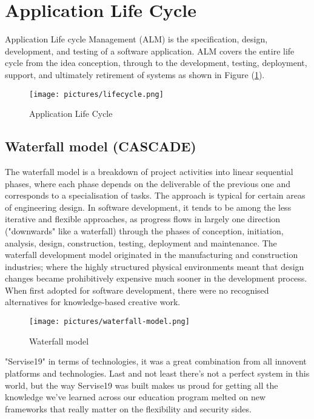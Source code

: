 \documentclass[12pt]{report}
\begin{document}
\section{Application Life Cycle}


Application Life cycle Management (ALM) is the specification, design, development, and testing of a software application. ALM covers the entire life cycle from the idea conception, through to the development, testing, deployment, support, and ultimately retirement of systems as shown in Figure (\ref{fig:applifecycle}).

\begin{figure}[!htbp]

        \centering
    \texttt{[image: pictures/lifecycle.png]}
    \caption{Application Life Cycle}
    \label{fig:applifecycle}
\end{figure}
\pagebreak
\subsection{Waterfall model (CASCADE)}
The waterfall model is a breakdown of project activities into linear sequential phases, where each phase depends on the deliverable of the previous one and corresponds to a specialisation of tasks. The approach is typical for certain areas of engineering design. In software development, it tends to be among the less iterative and flexible approaches, as progress flows in largely one direction ("downwards" like a waterfall) through the phases of conception, initiation, analysis, design, construction, testing, deployment and maintenance.
The waterfall development model originated in the manufacturing and construction industries; where the highly structured physical environments meant that design changes became prohibitively expensive much sooner in the development process. When first adopted for software development, there were no recognised alternatives for knowledge-based creative work.

\begin{figure}[!htbp]

        \centering
    \texttt{[image: pictures/waterfall-model.png]}
    \caption{Waterfall model}
    \label{fig:waterfallmodel}
\end{figure}
\pagebreak

"Servise19" in terms of technologies, it was a great combination from all innovent platforms and technologies.
Last and not least there's not a perfect system in this world, but the way Servise19 was built makes us proud for getting all the knowledge we've learned across our education program melted on new frameworks that really matter on the flexibility and security sides.
\end{document}
